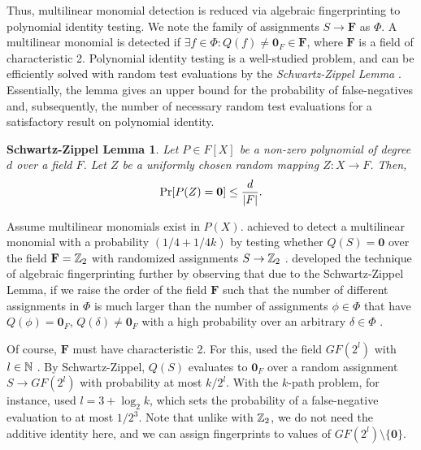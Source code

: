 Thus, multilinear monomial detection is reduced via algebraic fingerprinting 
to polynomial identity testing. 
We note the family of assignments $S \to \mathbf{F}$ as $\Phi$. 
A multilinear monomial is detected if 
$\exists f \in \Phi \colon Q(f) \neq \mathbf{0}_F \in \mathbf{F}$, 
where $\mathbf{F}$ is a field of characteristic 2. 
Polynomial identity testing is a well-studied problem, and can be efficiently 
solved with random test evaluations by the \emph{Schwartz-Zippel Lemma} \cite{Saxena09}. 
Essentially, the lemma gives an upper bound for the probability of false-negatives 
and, subsequently, the number of necessary random test evaluations 
for a satisfactory result on polynomial identity.

\newtheorem*{lemmaSZ}{Schwartz-Zippel Lemma}
\begin{lemmaSZ}
  Let $P \in F[X]$ be a non-zero polynomial of degree $d$ over a field $F$. 
  Let $Z$ be a uniformly chosen random mapping $Z \colon X \to F$. Then, 
  \[ 
    \Pr[P(Z) = \mathbf{0}] \leq \frac{d}{{\left\vert F\right\vert}}.  
  \]
\end{lemmaSZ}

Assume multilinear monomials exist in $P(X)$. 
\citeauthor{Koutis08} achieved to detect a multilinear monomial 
with a probability $(1/4 + 1/{4k})$ by testing whether 
$Q(S) = \mathbf{0}$ over the field $\mathbf{F} = \mathbb Z_2$  
with randomized assignments $S \to \mathbb Z_2$ \cite{Koutis08}. 
\citeauthor{Williams09} developed the technique of algebraic fingerprinting 
further by observing that due to the Schwartz-Zippel Lemma, %
if we raise the order of the field $\mathbf{F}$ 
such that the number of different assignments in $\Phi$ is much larger than 
the number of assignments $\phi \in \Phi$ that have $Q(\phi) = \mathbf{0}_F$, 
$Q(\delta) \neq \mathbf{0}_F$ with a high probability over an arbitrary $\delta \in \Phi$ 
\cite{Williams09}. 

Of course, $\mathbf{F}$ must have characteristic 2. For this, \citeauthor{Williams09} 
used the field $GF(2^{l})$ with $l \in \mathbb N$ \cite{Williams09}. By Schwartz-Zippel, $Q(S)$ 
evaluates to $\mathbf{0}_F$ over a random assignment $S \to GF(2^{l})$ with probability 
at most $k/{2^l}$. With the $k$-path problem, for instance, \citeauthor{Williams09} used $l = 3 + \log_2k$, 
which sets the probability of a false-negative evaluation 
to at most $1/2^3$. Note that unlike with $\mathbb Z_2$, 
we do not need the additive identity here, 
and we can assign fingerprints to values of $GF(2^{l}) \setminus \{\mathbf{0}\}$.

